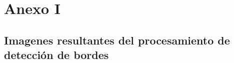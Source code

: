 \documentclass[11pt, a4paper]{article}
\begin{document}
\newpage
\section{Anexo I}
\subsection{Imagenes resultantes del procesamiento de detecci\'on de bordes}

\vspace{2cm}


\vspace{3cm}



\end{document}
